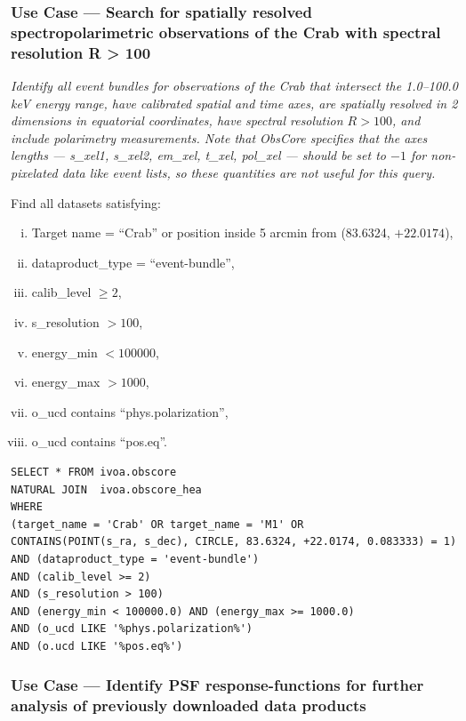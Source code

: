 \subsubsection{Use Case --- Search for spatially resolved spectropolarimetric observations of the Crab with spectral resolution R > 100}

{\em Identify all event bundles for observations of the Crab that intersect the 1.0--100.0 keV energy range, have calibrated spatial and time axes, are spatially resolved in 2 dimensions in equatorial coordinates, have spectral resolution $R>100$, and include polarimetry measurements.  Note that ObsCore specifies that the axes lengths --- s\_xel1, s\_xel2, em\_xel, t\_xel, pol\_xel --- should be set to $-1$ for non-pixelated data like event lists, so these quantities are not useful for this query.\/}

\medskip
\noindent Find all datasets satisfying:
\begin{enumerate}[(i)]
  \item Target name = ``Crab'' or position inside 5 arcmin from (83.6324, $+22.0174$),
  \item dataproduct\_type = ``event-bundle'',
  \item calib\_level $\geq 2$,
  \item s\_resolution $> 100$,
  \item energy\_min $< 100000$,
  \item energy\_max $> 1000$,
  \item o\_ucd contains ``phys.polarization'',
  \item o\_ucd contains ``pos.eq''.
\end{enumerate}

\begin{verbatim}
SELECT * FROM ivoa.obscore
NATURAL JOIN  ivoa.obscore_hea
WHERE
(target_name = 'Crab' OR target_name = 'M1' OR
CONTAINS(POINT(s_ra, s_dec), CIRCLE, 83.6324, +22.0174, 0.083333) = 1)
AND (dataproduct_type = 'event-bundle')
AND (calib_level >= 2)
AND (s_resolution > 100)
AND (energy_min < 100000.0) AND (energy_max >= 1000.0)
AND (o_ucd LIKE '%phys.polarization%')
AND (o.ucd LIKE '%pos.eq%')
\end{verbatim}


\subsubsection{Use Case --- Identify PSF response-functions for further analysis of previously downloaded data products}

